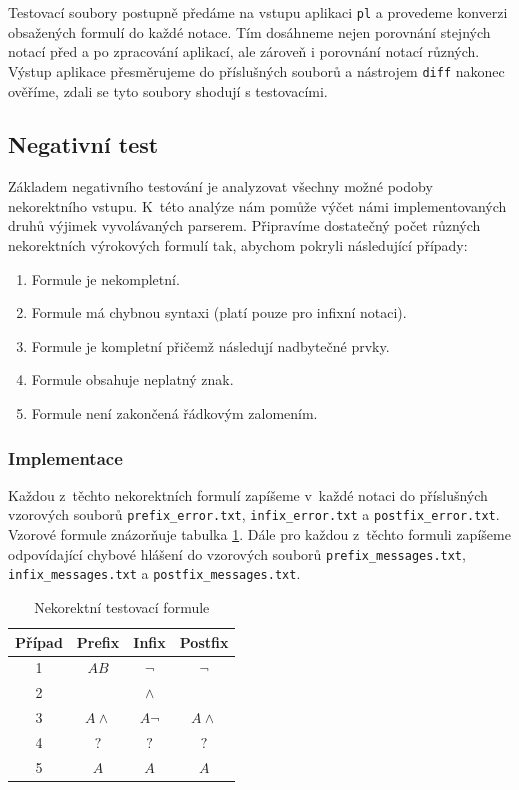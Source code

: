 \documentclass[thesis=B,czech,hidelinks]{thesis}[2012/06/26]
\begin{document}
Testovací soubory postupně předáme na vstupu aplikaci \texttt{pl} a provedeme konverzi obsažených formulí do každé notace. Tím dosáhneme nejen porovnání stejných notací před a po zpracování aplikací, ale zároveň i porovnání notací různých. Výstup aplikace přesměrujeme do příslušných souborů a nástrojem \texttt{diff} nakonec ověříme, zdali se tyto soubory shodují s testovacími.

\subsection{Negativní test}

Základem negativního testování je analyzovat všechny možné podoby nekorektního vstupu. K~této analýze nám pomůže výčet námi implementovaných druhů výjimek vyvolávaných parserem. Připravíme dostatečný počet různých nekorektních výrokových formulí tak, abychom pokryli následující případy:

\begin{enumerate}
	\item Formule je nekompletní.
	\item Formule má chybnou syntaxi (platí pouze pro infixní notaci).
	\item Formule je kompletní přičemž následují nadbytečné prvky.
	\item Formule obsahuje neplatný znak.
	\item Formule není zakončená řádkovým zalomením.
\end{enumerate}



\subsubsection{Implementace}

Každou z~těchto nekorektních formulí zapíšeme v~každé notaci do příslušných vzorových souborů \texttt{prefix\_error.txt}, \texttt{infix\_error.txt} a \texttt{postfix\_error.txt}. Vzorové formule znázorňuje tabulka \ref{tab:parsern}. Dále pro každou z~těchto formuli zapíšeme odpovídající chybové hlášení do vzorových souborů \texttt{prefix\_messages.txt}, \texttt{infix\_messages.txt} a \texttt{postfix\_messages.txt}.

\begin{table}
\centering
\caption{Nekorektní testovací formule}
\label{tab:parsern}
\begin{tabular}{|c|c|c|c|}\hline
	Případ & Prefix & Infix & Postfix \tabularnewline \hline \hline
	1 & $AB$ & $\neg$ & $\neg$ \tabularnewline \hline
	2 & & $\wedge$ & \tabularnewline \hline
	3 & $A \wedge$ & $A \neg$ & $A \wedge$ \tabularnewline \hline
	4 & $?$ & $?$ & $?$ \tabularnewline \hline
	5 & $A$ & $A$ & $A$ \tabularnewline \hline
\end{tabular}
\end{table}
\end{document}

